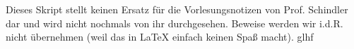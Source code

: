 \documentclass{jvfscript-de}
\begin{document}
	\frontmatter
	\maketitle
	
\tableofcontents
\newpage
\thispagestyle{plain}
Dieses Skript stellt keinen Ersatz für die Vorlesungsnotizen von Prof. Schindler dar und wird nicht nochmals von ihr durchgesehen. Beweise werden wir i.d.R. nicht übernehmen (weil das in \LaTeX{} einfach keinen Spaß macht). \hspace{\fill} glhf
\newpage
\mainmatter
{}			%
	
	
	
	
	
	
	
	
	
	
	
	

	\printindex
\end{document}

